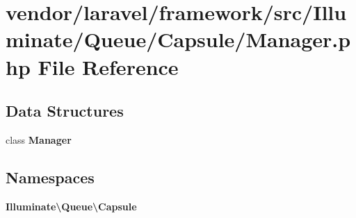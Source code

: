 \section{vendor/laravel/framework/src/\+Illuminate/\+Queue/\+Capsule/\+Manager.php File Reference}
\label{_queue_2_capsule_2_manager_8php}
\subsection*{Data Structures}
\begin{DoxyCompactItemize}
\item 
class {\bf Manager}
\end{DoxyCompactItemize}
\subsection*{Namespaces}
\begin{DoxyCompactItemize}
\item 
 {\bf Illuminate\textbackslash{}\+Queue\textbackslash{}\+Capsule}
\end{DoxyCompactItemize}
